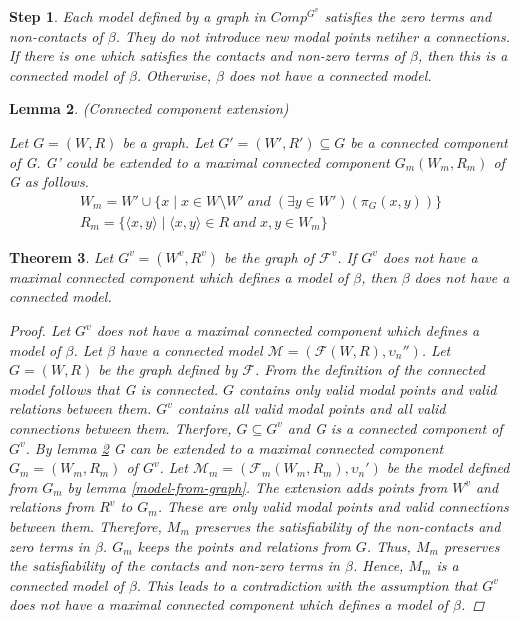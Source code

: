 \documentclass{article}
\newcommand\M{\mathcal{M}}
\newcommand\F{\mathcal{F}}
\newtheorem{theorem}{Theorem}[section]
\newtheorem{lemma}[theorem]{Lemma}
\newtheorem{step}[theorem]{Step}
\newcommand{\pair}[2]{ \langle #1, #2 \rangle }
\newcommand{\pairXY}{ \pair{x}{y} }
\begin{document}
	\begin{step}
		Each model defined by a graph in $Comp^{G^v}$ satisfies the zero terms and non-contacts of $\beta$. They do not introduce new modal points netiher a connections. If there is one which satisfies the contacts and non-zero terms of $\beta$, then this is a connected model of $\beta$. Otherwise, $\beta$ does not have a connected model.
	\end{step}

	\begin{lemma}(Connected component extension)\label{connected-component-extension}

		Let $G=(W, R)$ be a graph. Let $G'=(W', R') \subseteq G$ be a connected component of G.
		G' could be extended to a maximal connected component $G_m(W_m, R_m)$  of G as follows.
		\label{connected-component-extension}\begin{gather*}
			 W_m = W' \cup \{ x \mid x \in W \setminus W' \; and \; (\exists y \in W')(\pi_G(x,y)) \} \\
			 R_m = \{ \pairXY \mid \pairXY \in R \; and \; x, y \in W_m \}
		\end{gather*}
	\end{lemma}

	\begin{theorem}
		Let $G^v=(W^v, R^v)$ be the graph of $\F^v$. If $G^v$ does not have a maximal connected component which defines a model of $\beta$, then $\beta$ does not have a connected model.
		\begin{proof}
			Let $G^v$ does not have a maximal connected component which defines a model of $\beta$. Let $\beta$ have a connected model $\M = (\F(W, R), \upsilon_n'')$. Let $G=(W, R)$ be the graph defined by $\F$. From the definition of the connected model follows that G is connected. $G$ contains only valid modal points and valid relations between them. $G^v$ contains all valid modal points and all valid connections between them. Therfore, $G \subseteq G^v$ and G is a connected component of $G^v$.
			By lemma \ref{connected-component-extension} G can be extended to a maximal connected component $G_m=(W_m, R_m)$ of $G^v$. Let $\M_m = (\F_m(W_m, R_m), \upsilon_n')$ be the model defined from $G_m$ by lemma \ref{model-from-graph}.
			The extension adds points from $W^v$ and relations from $R^v$ to $G_m$. These are only valid modal points and valid connections between them. Therefore, $M_m$ preserves the satisfiability of the non-contacts and zero terms in $\beta$. $G_m$ keeps the points and relations from $G$. Thus, $M_m$ preserves the satisfiability of the contacts and non-zero terms in $\beta$. Hence, $M_m$ is a connected model of $\beta$. This leads to a contradiction with the assumption that $G^v$ does not have a maximal connected component which defines a model of $\beta$.
		\end{proof}
	\end{theorem}
\end{document}
